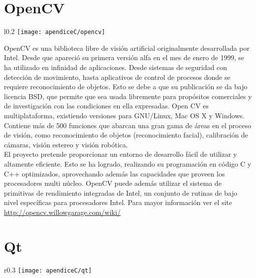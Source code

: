 \section{OpenCV}

\begin{wrapfigure}{l}{0.2\textwidth}
    \texttt{[image: apendiceC/opencv]}
\end{wrapfigure}

OpenCV es una biblioteca libre de visión artificial originalmente desarrollada por Intel. 
Desde que apareció su primera versión alfa en el mes de enero de 1999, se ha utilizado en 
infinidad de aplicaciones. Desde sistemas de seguridad con detección de movimiento, hasta 
aplicativos de control de procesos donde se requiere reconocimiento de objetos. Esto se 
debe a que su publicación se da bajo licencia BSD, que permite que sea usada libremente 
para propósitos comerciales y de investigación con las condiciones en ella expresadas.
Open CV es multiplataforma, existiendo versiones para GNU/Linux, Mac OS X y Windows. 
Contiene más de 500 funciones que abarcan una gran gama de áreas en el proceso de visión, 
como reconocimiento de objetos (reconocimiento facial), calibración de cámaras, visión 
estereo y visión robótica.\\
El proyecto pretende proporcionar un entorno de desarrollo fácil de utilizar y altamente 
eficiente. Esto se ha logrado, realizando su programación en código C y C++ optimizados, 
aprovechando además las capacidades que proveen los procesadores multi núcleo. OpenCV puede 
además utilizar el sistema de primitivas de rendimiento integradas de Intel, un conjunto 
de rutinas de bajo nivel específicas para procesadores Intel.
Para mayor información ver el site \url{http://opencv.willowgarage.com/wiki/}

\section{Qt}

\begin{wrapfigure}{r}{0.3\textwidth}
    \texttt{[image: apendiceC/qt]}
\end{wrapfigure}

